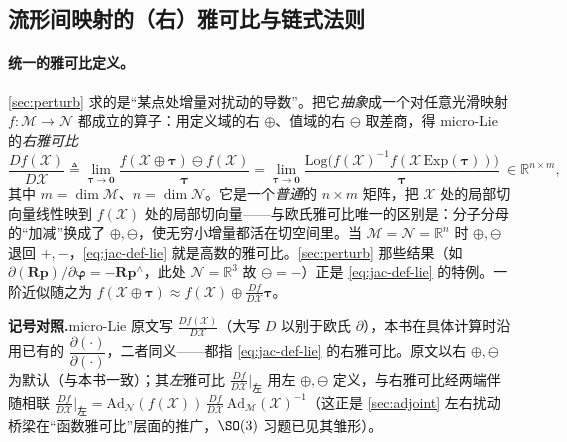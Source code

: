 \subsection{流形间映射的（右）雅可比与链式法则}
\label{subsec:lie-jac-def}

\paragraph{统一的雅可比定义。}\cref{sec:perturb} 求的是“某点处增量对扰动的导数”。把它\emph{抽象}成一个对任意光滑映射 $f:\mathcal{M}\to\mathcal{N}$ 都成立的算子：用定义域的右 $\oplus$、值域的右 $\ominus$ 取差商，得 micro-Lie 的\emph{右雅可比}\cite{sola2018micro}
\begin{equation}
  \frac{Df(\mathcal{X})}{D\mathcal{X}}
  \triangleq\lim_{\boldsymbol{\tau}\to\mathbf{0}}\frac{f(\mathcal{X}\oplus\boldsymbol{\tau})\ominus f(\mathcal{X})}{\boldsymbol{\tau}}
  =\lim_{\boldsymbol{\tau}\to\mathbf{0}}\frac{\mathrm{Log}\big(f(\mathcal{X})^{-1}f(\mathcal{X}\,\mathrm{Exp}(\boldsymbol{\tau}))\big)}{\boldsymbol{\tau}}
  \ \in\mathbb{R}^{n\times m},
  \label{eq:jac-def-lie}
\end{equation}
其中 $m=\dim\mathcal{M}$、$n=\dim\mathcal{N}$。它是一个\emph{普通}的 $n\times m$ 矩阵，把 $\mathcal{X}$ 处的局部切向量线性映到 $f(\mathcal{X})$ 处的局部切向量——与欧氏雅可比唯一的区别是：分子分母的“加减”换成了 $\oplus,\ominus$，使无穷小增量都活在切空间里。当 $\mathcal{M}=\mathcal{N}=\mathbb{R}^n$ 时 $\oplus,\ominus$ 退回 $+,-$，\cref{eq:jac-def-lie} 就是高数的雅可比。\cref{sec:perturb} 那些结果（如 $\partial(\mathbf{R}\mathbf{p})/\partial\boldsymbol{\varphi}=-\mathbf{R}\mathbf{p}^\wedge$，此处 $\mathcal{N}=\mathbb{R}^3$ 故 $\ominus=-$）正是 \cref{eq:jac-def-lie} 的特例。一阶近似随之为 $f(\mathcal{X}\oplus\boldsymbol{\tau})\approx f(\mathcal{X})\oplus\frac{Df}{D\mathcal{X}}\boldsymbol{\tau}$。

\begin{note}
\textbf{记号对照.}\;micro-Lie 原文写 $\frac{Df(\mathcal{X})}{D\mathcal{X}}$（大写 $D$ 以别于欧氏 $\partial$），本书在具体计算时沿用已有的 $\dfrac{\partial(\cdot)}{\partial(\cdot)}$，二者同义——都指 \cref{eq:jac-def-lie} 的右雅可比。原文以右 $\oplus,\ominus$ 为默认（与本书一致）；其\emph{左}雅可比 $\frac{Df}{D\mathcal{X}}\big|_{\text{左}}$ 用左 $\oplus,\ominus$ 定义，与右雅可比经两端伴随相联 $\frac{Df}{D\mathcal{X}}\big|_{\text{左}}=\mathrm{Ad}_{\mathcal{N}}(f(\mathcal{X}))\,\frac{Df}{D\mathcal{X}}\,\mathrm{Ad}_{\mathcal{M}}(\mathcal{X})^{-1}$（这正是 \cref{sec:adjoint} 左右扰动桥梁在“函数雅可比”层面的推广，$\SO(3)$ 习题已见其雏形）。
\end{note}

